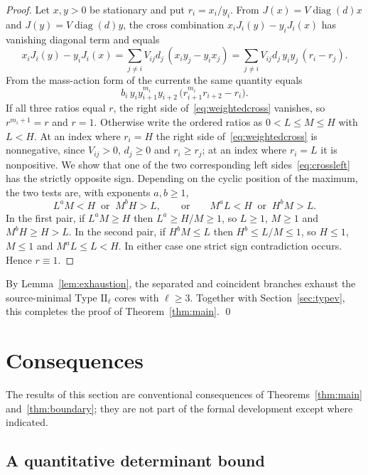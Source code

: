 \documentclass[11pt,a4paper]{article}
\theoremstyle{plain}
\theoremstyle{definition}
\theoremstyle{remark}
\numberwithin{equation}{section}
\newcommand{\diag}{\operatorname{diag}}
\newcommand{\II}{\mathrm{II}}
\begin{document}
\begin{proof}
Let $x,y>0$ be stationary and put $r_i=x_i/y_i$. From $J(x)=V\diag(d)x$ and $J(y)=V\diag(d)y$, the cross combination $x_iJ_i(y)-y_iJ_i(x)$ has vanishing diagonal term and equals
\begin{equation}\label{eq:weightedcross}
x_iJ_i(y)-y_iJ_i(x)=\sum_{j\ne i}V_{ij}d_j\,(x_iy_j-y_ix_j)=\sum_{j\neq i}V_{ij}d_j\,y_iy_j\,(r_i-r_j).
\end{equation}
From the mass-action form of the currents the same quantity equals
\begin{equation}\label{eq:crossleft}
b_i\,y_iy_{i+1}^{m_i}y_{i+2}\,\bigl(r_{i+1}^{m_i}r_{i+2}-r_i\bigr).
\end{equation}
If all three ratios equal $r$, the right side of~\eqref{eq:weightedcross} vanishes, so $r^{m_i+1}=r$ and $r=1$. Otherwise write the ordered ratios as $0<L\le M\le H$ with $L<H$. At an index where $r_i=H$ the right side of~\eqref{eq:weightedcross} is nonnegative, since $V_{ij}>0$, $d_j\ge0$ and $r_i\ge r_j$; at an index where $r_i=L$ it is nonpositive. We show that one of the two corresponding left sides~\eqref{eq:crossleft} has the strictly opposite sign. Depending on the cyclic position of the maximum, the two tests are, with exponents $a,b\ge1$,
\[
L^aM<H\ \text{ or }\ M^bH>L,
\qquad\text{or}\qquad
M^aL<H\ \text{ or }\ H^bM>L .
\]
In the first pair, if $L^aM\ge H$ then $L^a\ge H/M\ge1$, so $L\ge1$, $M\ge1$ and $M^bH\ge H>L$. In the second pair, if $H^bM\le L$ then $H^b\le L/M\le1$, so $H\le1$, $M\le1$ and $M^aL\le L<H$. In either case one strict sign contradiction occurs. Hence $r\equiv1$.
\end{proof}

By Lemma~\ref{lem:exhaustion}, the separated and coincident branches exhaust the source-minimal Type $\II_\ell$ cores with $\ell\ge3$. Together with Section~\ref{sec:typev}, this completes the proof of Theorem~\ref{thm:main}. \qed

\section{Consequences}\label{sec:consequences}

The results of this section are conventional consequences of Theorems~\ref{thm:main} and~\ref{thm:boundary}; they are not part of the formal development except where indicated.

\subsection{A quantitative determinant bound}
\end{document}
